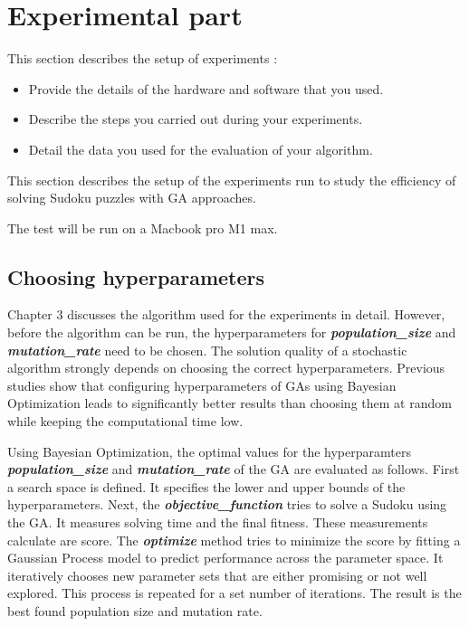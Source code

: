 \section{Experimental part}
\label{sec:experimentation}

{\color{red}
This section describes the setup of experiments \cite{zobel2014experimentation}:

\begin{itemize}
    \item Provide the details of the hardware and software that you used.
    \item Describe the steps you carried out during your experiments.
    \item Detail the data you used for the evaluation of your algorithm.
\end{itemize}
}

This section describes the setup of the experiments run to study the efficiency of solving Sudoku puzzles with GA approaches.

The test will be run on a Macbook pro M1 max.

\subsection{Choosing hyperparameters}
Chapter 3 discusses the algorithm used for the experiments in detail. However, before the algorithm can be run, the hyperparameters for \textit{\textbf{population\_size}} and \textit{\textbf{mutation\_rate}} need to be chosen. The solution quality of a stochastic algorithm strongly depends on choosing the correct hyperparameters. Previous studies show that configuring hyperparameters of GAs using Bayesian Optimization leads to significantly better results than choosing them at random while keeping the computational time low\cite{Ruether}.

Using Bayesian Optimization, the optimal values for the hyperparamters \textit{\textbf{population\_size}} and \textit{\textbf{mutation\_rate}} of the GA are evaluated as follows. First a search space is defined. It specifies the lower and upper bounds of the hyperparameters. Next, the \textit{\textbf{objective\_function}} tries to solve a Sudoku using the GA. It measures solving time and the final fitness. These measurements calculate are score. The \textit{\textbf{optimize}} method tries to minimize the score by fitting a Gaussian Process model to predict performance across the parameter space. It iteratively chooses new parameter sets that are either promising or not well explored. This process is repeated for a set number of iterations. The result is the best found population size and mutation rate. 

